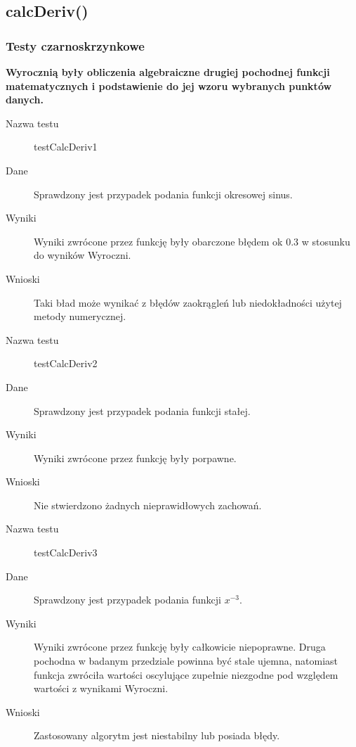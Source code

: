 \documentclass[12pt,a4paper,notitlepage]{article}
\begin{document}
\subsection{calcDeriv()}
\subsubsection{Testy czarnoskrzynkowe}
\textbf{Wyrocznią były obliczenia algebraiczne drugiej pochodnej funkcji matematycznych i podstawienie do jej wzoru wybranych punktów danych.}
\begin{description}
\item [Nazwa testu] testCalcDeriv1
\item [Dane] Sprawdzony jest przypadek podania funkcji okresowej sinus.
\item [Wyniki] Wyniki zwrócone przez funkcję były obarczone błędem ok 0.3 w stosunku do wyników Wyroczni.
\item [Wnioski] Taki bład może wynikać z błędów zaokrągleń lub niedokładności użytej metody numerycznej. 
\end{description}
\vspace*{5mm}
\begin{description}
\item [Nazwa testu] testCalcDeriv2
\item [Dane] Sprawdzony jest przypadek podania funkcji stałej.
\item [Wyniki] Wyniki zwrócone przez funkcję były porpawne.
\item [Wnioski] Nie stwierdzono żadnych nieprawidłowych zachowań.
\end{description}
\vspace*{5mm}
\begin{description}
\item [Nazwa testu] testCalcDeriv3
\item [Dane] Sprawdzony jest przypadek podania funkcji $x^{-3}$.
\item [Wyniki] Wyniki zwrócone przez funkcję były całkowicie niepoprawne. Druga pochodna w badanym przedziale powinna być stale ujemna, natomiast funkcja zwróciła wartości oscylujące zupełnie niezgodne pod względem wartości z wynikami Wyroczni.
\item [Wnioski] Zastosowany algorytm jest niestabilny lub posiada błędy.
\end{description}
\end{document}
